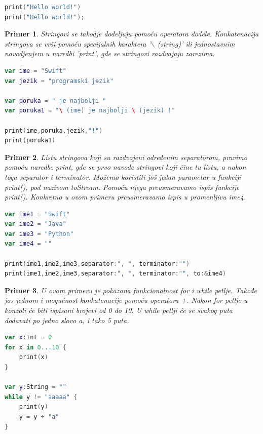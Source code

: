 \documentclass[a4paper]{article}
\newtheorem{primer}{Primer}[section]
\begin{document}
\begin{lstlisting}[language=Swift, caption={Ispis teksta},frame=single, label=simple]
print("Hello world!")
print("Hello world!");
\end{lstlisting}

\begin{primer}
Stringovi se takodje dodeljuju pomoću operatora dodele. Konkatenacija stringova se vrši pomoću specijalnih karaktera '$\backslash$ (string)' ili jednostavnim navodjenjem u naredbi 'print', gde se stringovi razdvajaju zarezima.
\end{primer}

\begin{lstlisting}[language=Swift, caption={Stringovi i konkatenacija stringova},frame=single, label=simple]
var ime = "Swift"
var jezik = "programski jezik"

var poruka = " je najbolji "
var poruka1 = "\ (ime) je najbolji \ (jezik) !" 

print(ime,poruka,jezik,"!")
print(poruka1)
\end{lstlisting}

\begin{primer}
Listu stringova koji su razdvojeni određenim separatorom, pravimo pomoću naredbe print, gde se prvo navode stringovi koji čine tu listu, a nakon toga separator i terminator. Možemo koristiti još jedan parametar u funkciji print(), pod nazivom toStream. Pomoću njega preusmeravamo ispis funkcije print(). Konkretno u ovom primeru preusmeravamo ispis u promenljivu ime4.
\end{primer}

\begin{lstlisting}[language=Swift, caption={Lista stringova},frame=single, label=simple]
var ime1 = "Swift"
var ime2 = "Java"
var ime3 = "Python"
var ime4 = ""

print(ime1,ime2,ime3,separator:", ", terminator:"")
print(ime1,ime2,ime3,separator:", ", terminator:"", to:&ime4)
\end{lstlisting}

\begin{primer}
U ovom primeru je pokazana funkcionalnost for i while petlje. Takođe jos jednom i mogućnost konkatenacije pomoću operatora +. Nakon for petlje u konzoli će biti ispisani brojevi od 0 do 10. U while petlji će se svakog puta dodavati po jedno slovo a, i tako 5 puta.
\end{primer}

\begin{lstlisting}[language=Swift, caption={Petlje},frame=single, label=simple]
var x:Int = 0
for x in 0...10 {
	print(x)
}

var y:String = ""
while y != "aaaaa" {
	print(y)
	y = y + "a"
}
\end{lstlisting}
\end{document}
